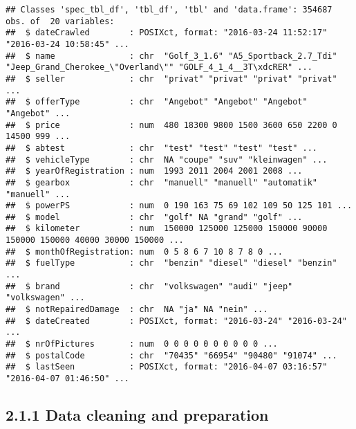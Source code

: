 \documentclass[]{article}
\begin{document}
\begin{verbatim}
## Classes 'spec_tbl_df', 'tbl_df', 'tbl' and 'data.frame': 354687 obs. of  20 variables:
##  $ dateCrawled        : POSIXct, format: "2016-03-24 11:52:17" "2016-03-24 10:58:45" ...
##  $ name               : chr  "Golf_3_1.6" "A5_Sportback_2.7_Tdi" "Jeep_Grand_Cherokee_\"Overland\"" "GOLF_4_1_4__3T\xdcRER" ...
##  $ seller             : chr  "privat" "privat" "privat" "privat" ...
##  $ offerType          : chr  "Angebot" "Angebot" "Angebot" "Angebot" ...
##  $ price              : num  480 18300 9800 1500 3600 650 2200 0 14500 999 ...
##  $ abtest             : chr  "test" "test" "test" "test" ...
##  $ vehicleType        : chr  NA "coupe" "suv" "kleinwagen" ...
##  $ yearOfRegistration : num  1993 2011 2004 2001 2008 ...
##  $ gearbox            : chr  "manuell" "manuell" "automatik" "manuell" ...
##  $ powerPS            : num  0 190 163 75 69 102 109 50 125 101 ...
##  $ model              : chr  "golf" NA "grand" "golf" ...
##  $ kilometer          : num  150000 125000 125000 150000 90000 150000 150000 40000 30000 150000 ...
##  $ monthOfRegistration: num  0 5 8 6 7 10 8 7 8 0 ...
##  $ fuelType           : chr  "benzin" "diesel" "diesel" "benzin" ...
##  $ brand              : chr  "volkswagen" "audi" "jeep" "volkswagen" ...
##  $ notRepairedDamage  : chr  NA "ja" NA "nein" ...
##  $ dateCreated        : POSIXct, format: "2016-03-24" "2016-03-24" ...
##  $ nrOfPictures       : num  0 0 0 0 0 0 0 0 0 0 ...
##  $ postalCode         : chr  "70435" "66954" "90480" "91074" ...
##  $ lastSeen           : POSIXct, format: "2016-04-07 03:16:57" "2016-04-07 01:46:50" ...
\end{verbatim}

\hypertarget{data-cleaning-and-preparation}{%
\subsection{2.1.1 Data cleaning and
preparation}\label{data-cleaning-and-preparation}}
\end{document}
